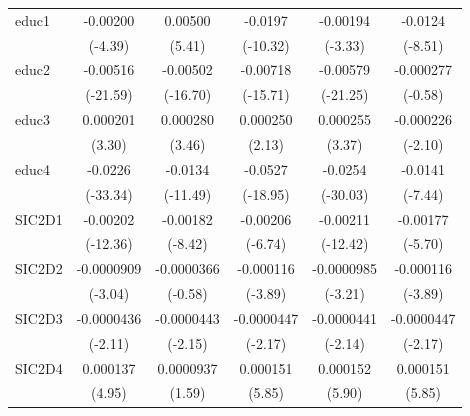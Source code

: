 \begin{table}[htbp]
\begin{tabular}{l*{5}{c}}
educ1       &    -0.00200\sym{***}&     0.00500\sym{***}&     -0.0197\sym{***}&    -0.00194\sym{***}&     -0.0124\sym{***}\\
            &     (-4.39)         &      (5.41)         &    (-10.32)         &     (-3.33)         &     (-8.51)         \\
educ2       &    -0.00516\sym{***}&    -0.00502\sym{***}&    -0.00718\sym{***}&    -0.00579\sym{***}&   -0.000277         \\
            &    (-21.59)         &    (-16.70)         &    (-15.71)         &    (-21.25)         &     (-0.58)         \\
educ3       &    0.000201\sym{***}&    0.000280\sym{***}&    0.000250\sym{*}  &    0.000255\sym{***}&   -0.000226\sym{*}  \\
            &      (3.30)         &      (3.46)         &      (2.13)         &      (3.37)         &     (-2.10)         \\
educ4       &     -0.0226\sym{***}&     -0.0134\sym{***}&     -0.0527\sym{***}&     -0.0254\sym{***}&     -0.0141\sym{***}\\
            &    (-33.34)         &    (-11.49)         &    (-18.95)         &    (-30.03)         &     (-7.44)         \\
SIC2D1      &    -0.00202\sym{***}&    -0.00182\sym{***}&    -0.00206\sym{***}&    -0.00211\sym{***}&    -0.00177\sym{***}\\
            &    (-12.36)         &     (-8.42)         &     (-6.74)         &    (-12.42)         &     (-5.70)         \\
SIC2D2      &  -0.0000909\sym{**} &  -0.0000366         &   -0.000116\sym{***}&  -0.0000985\sym{**} &   -0.000116\sym{***}\\
            &     (-3.04)         &     (-0.58)         &     (-3.89)         &     (-3.21)         &     (-3.89)         \\
SIC2D3      &  -0.0000436\sym{*}  &  -0.0000443\sym{*}  &  -0.0000447\sym{*}  &  -0.0000441\sym{*}  &  -0.0000447\sym{*}  \\
            &     (-2.11)         &     (-2.15)         &     (-2.17)         &     (-2.14)         &     (-2.17)         \\
SIC2D4      &    0.000137\sym{***}&   0.0000937         &    0.000151\sym{***}&    0.000152\sym{***}&    0.000151\sym{***}\\
            &      (4.95)         &      (1.59)         &      (5.85)         &      (5.90)         &      (5.85)         \\

\end{tabular}
\end{table}
